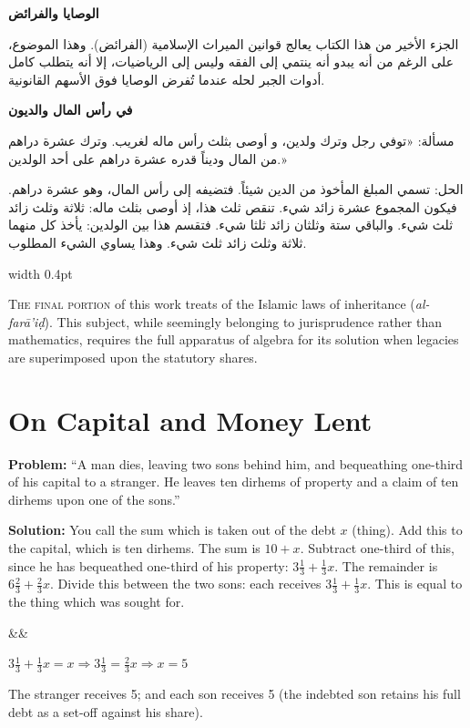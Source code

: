 \documentclass[11pt,a4paper,openany,oneside]{book}
\newenvironment{mathbox}[1][]{%
  \smallskip\par\noindent
  \begin{lrbox}{\mathboxsave}
  \begin{minipage}{\dimexpr\linewidth-2\fboxsep-2\fboxrule\relax}%
  \setlength{\parskip}{0.3em}%
  \ifx&#1&\else\textbf{#1}\\[0.2cm]\fi
}{%
  \end{minipage}%
  \end{lrbox}
  \fcolorbox{sectioncolor}{mathbg}{\usebox{\mathboxsave}}%
  \smallskip}
\begin{document}
\noindent\begin{minipage}[t]{0.48\textwidth}
\raggedleft

\begin{Arabic}
\textbf{الوصايا والفرائض}

الجزء الأخير من هذا الكتاب يعالج قوانين الميراث الإسلامية (الفرائض). وهذا الموضوع، على الرغم من أنه يبدو أنه ينتمي إلى الفقه وليس إلى الرياضيات، إلا أنه يتطلب كامل أدوات الجبر لحله عندما تُفرض الوصايا فوق الأسهم القانونية.

\textbf{في رأس المال والديون}

مسألة: «توفي رجل وترك ولدين، و أوصى بثلث رأس ماله لغريب. وترك عشرة دراهم من المال وديناً قدره عشرة دراهم على أحد الولدين.»

الحل: تسمي المبلغ المأخوذ من الدين شيئاً. فتضيفه إلى رأس المال، وهو عشرة دراهم. فيكون المجموع عشرة زائد شيء. تنقص ثلث هذا، إذ أوصى بثلث ماله: ثلاثة وثلث زائد ثلث شيء. والباقي ستة وثلثان زائد ثلثا شيء. فتقسم هذا بين الولدين: يأخذ كل منهما ثلاثة وثلث زائد ثلث شيء. وهذا يساوي الشيء المطلوب.
\end{Arabic}

\end{minipage}%
\hfill\vrule width 0.4pt\hfill
\begin{minipage}[t]{0.48\textwidth}
\raggedright

\lettrine[lines=2, lhang=0.33, nindent=0em, findent=3pt, loversize=0.14]{
\textcolor{dropgold}{T}}{he final portion} of this work treats of the Islamic laws of inheritance (\textit{al-farā'iḍ}). This subject, while seemingly belonging to jurisprudence rather than mathematics, requires the full apparatus of algebra for its solution when legacies are superimposed upon the statutory shares.

\section*{On Capital and Money Lent}

\textbf{Problem:} ``A man dies, leaving two sons behind him, and bequeathing one-third of his capital to a stranger. He leaves ten dirhems of property and a claim of ten dirhems upon one of the sons.''

\textbf{Solution:} You call the sum which is taken out of the debt $x$ (thing). Add this to the capital, which is ten dirhems. The sum is $10 + x$. Subtract one-third of this, since he has bequeathed one-third of his property: $3\tfrac{1}{3} + \tfrac{1}{3}x$. The remainder is $6\tfrac{2}{3} + \tfrac{2}{3}x$. Divide this between the two sons: each receives $3\tfrac{1}{3} + \tfrac{1}{3}x$. This is equal to the thing which was sought for.

\begin{mathbox}
$3\tfrac{1}{3} + \tfrac{1}{3}x = x \Rightarrow 3\tfrac{1}{3} = \tfrac{2}{3}x \Rightarrow x = 5$
\end{mathbox}

The stranger receives 5; and each son receives 5 (the indebted son retains his full debt as a set-off against his share).

\end{minipage}
\vspace{0.3cm}
\end{document}
